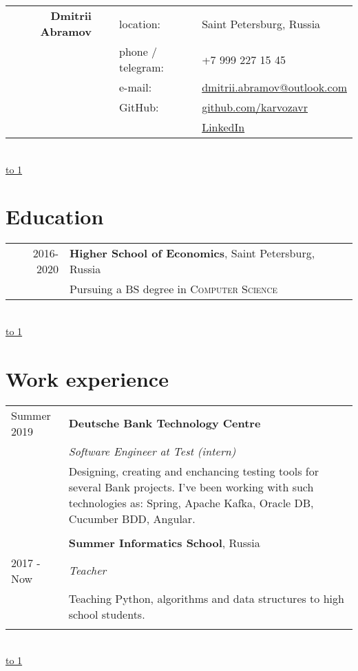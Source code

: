 \documentclass[10pt]{article}
\def\LINE{\vspace*{-1em}\noindent \underline{\hbox to 1\textwidth{{ } \hfil{ } \hfil{ } }}}
\begin{document}
\begin{tabular}{rlll}
        {\bf \Huge  Dmitrii Abramov} &  \  & location: &Saint Petersburg, Russia \\
    & \ & phone / telegram:   & +7 999 227 15 45\\
    & \ & e-mail:             & \href{mailto:dmitrii.abramov@outlook.com}{dmitrii.abramov@outlook.com}\\
    & \ & GitHub:             & \href{https://github.com/karvozavr}{github.com/karvozavr}\\
    & \ &   \                 & \href{https://www.linkedin.com/in/dmitriy-abramov/}{LinkedIn}
\end{tabular}
 \\

\LINE

\section*{Education}
\begin{tabular}{rl}
 \textsc{2016-2020} & \textbf{Higher School of Economics}, Saint Petersburg, Russia\\
 \  & Pursuing a BS degree in \textsc{Computer Science}
\end{tabular}



\  \\

\LINE
\section*{Work experience}
\begin{tabular}{p{2.5cm}|p{14cm}}

  Summer 2019 & \textbf{Deutsche Bank Technology Centre} \\
    & \emph{Software Engineer at Test (intern)}\\
  & \footnotesize{Designing, creating and enchancing testing tools for several Bank projects. \newline I've been working with such technologies as: Spring, Apache Kafka, Oracle DB, Cucumber BDD, Angular.}\\
  \\
   \  & \textbf{Summer Informatics School}, Russia \\
   2017 - Now &\emph{Teacher}\\
   \  &\footnotesize{Teaching Python, algorithms and data structures to high school students.}\\\multicolumn{2}{c}{} \\
\end{tabular}
\\
\LINE
\end{document}
